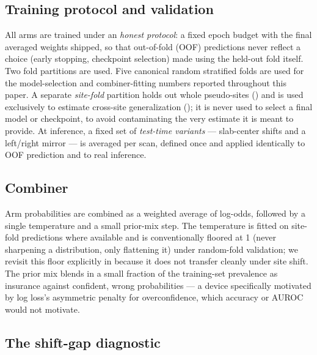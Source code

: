 \documentclass[10pt]{article}
\begin{document}
\subsection{Training protocol and validation}
\label{sec:validation}

All arms are trained under an \emph{honest protocol}: a fixed epoch budget with the final averaged weights shipped, so that out-of-fold (OOF) predictions never reflect a choice (early stopping, checkpoint selection) made using the held-out fold itself. Two fold partitions are used. Five canonical random stratified folds are used for the model-selection and combiner-fitting numbers reported throughout this paper. A separate \emph{site-fold} partition holds out whole pseudo-sites () and is used exclusively to estimate cross-site generalization (); it is never used to select a final model or checkpoint, to avoid contaminating the very estimate it is meant to provide. At inference, a fixed set of \emph{test-time variants} --- slab-center shifts and a left/right mirror --- is averaged per scan, defined once and applied identically to OOF prediction and to real inference.

\subsection{Combiner}
\label{sec:combiner}

Arm probabilities are combined as a weighted average of log-odds, followed by a single temperature and a small prior-mix step. The temperature is fitted on site-fold predictions where available and is conventionally floored at 1 (never sharpening a distribution, only flattening it) under random-fold validation; we revisit this floor explicitly in  because it does not transfer cleanly under site shift. The prior mix blends in a small fraction of the training-set prevalence as insurance against confident, wrong probabilities --- a device specifically motivated by log loss's asymmetric penalty for overconfidence, which accuracy or AUROC would not motivate.

\subsection{The shift-gap diagnostic}
\label{sec:shiftgap}
\end{document}
